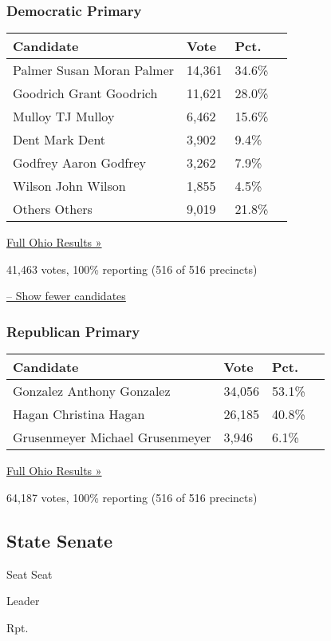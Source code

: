 \hypertarget{democratic-primary-17}{%
\subsubsection{Democratic Primary}\label{democratic-primary-17}}

\begin{longtable}[]{@{}llll@{}}
\toprule
Candidate & Vote & Pct. &\tabularnewline
\midrule
\endhead
 Palmer Susan Moran Palmer & 14,361 & 34.6\% &\tabularnewline
 Goodrich Grant Goodrich & 11,621 & 28.0\% &\tabularnewline
 Mulloy TJ Mulloy & 6,462 & 15.6\% &\tabularnewline
 Dent Mark Dent & 3,902 & 9.4\% &\tabularnewline
 Godfrey Aaron Godfrey & 3,262 & 7.9\% &\tabularnewline
 Wilson John Wilson & 1,855 & 4.5\% &\tabularnewline
 Others Others & 9,019 & 21.8\% &\tabularnewline
\bottomrule
\end{longtable}

\href{https://www.nytimes3xbfgragh.onion/elections/results/ohio}{Full
Ohio Results »}

41,463 votes, 100\% reporting (516 of 516 precincts)

\protect\hyperlink{}{-- Show fewer candidates}

\hypertarget{republican-primary-17}{%
\subsubsection{Republican Primary}\label{republican-primary-17}}

\begin{longtable}[]{@{}llll@{}}
\toprule
Candidate & Vote & Pct. &\tabularnewline
\midrule
\endhead
 Gonzalez Anthony Gonzalez & 34,056 & 53.1\% &\tabularnewline
 Hagan Christina Hagan & 26,185 & 40.8\% &\tabularnewline
 Grusenmeyer Michael Grusenmeyer & 3,946 & 6.1\% &\tabularnewline
\bottomrule
\end{longtable}

\href{https://www.nytimes3xbfgragh.onion/elections/results/ohio}{Full
Ohio Results »}

64,187 votes, 100\% reporting (516 of 516 precincts)

\hypertarget{state-senate}{%
\subsection{State Senate}\label{state-senate}}

Seat Seat

Leader

Rpt.


